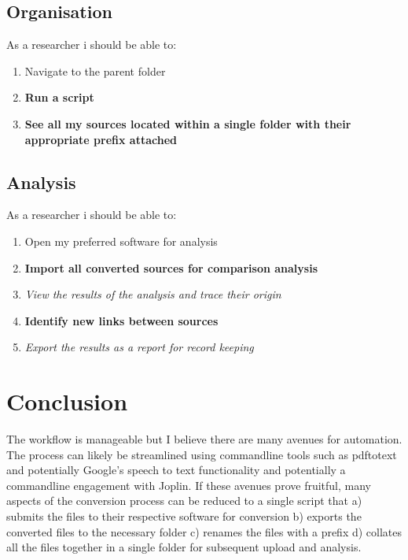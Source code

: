 \documentclass{article}
\begin{document}
\subsection{Organisation}
As a researcher i should be able to:
\begin{enumerate}
    \item Navigate to the parent folder
    \item\textbf{Run a script}
    \item\textbf{See all my sources located within a single folder with their appropriate prefix attached}
\end{enumerate}

\subsection{Analysis}
As a researcher i should be able to:
\begin{enumerate}
    \item Open my preferred software for analysis
    \item\textbf{Import all converted sources for comparison analysis}
    \item\textit{View the results of the analysis and trace their origin}
    \item\textbf{Identify new links between sources}
    \item\textit{Export the results as a report for record keeping}
\end{enumerate}

\section{Conclusion}
The workflow is manageable but I believe there are many avenues for automation. The process can likely be streamlined using commandline tools such as pdftotext and potentially Google's speech to text functionality and potentially a commandline engagement with Joplin. If these avenues prove fruitful, many aspects of the conversion process can be reduced to a single script that a) submits the files to their respective software for conversion b) exports the converted files to the necessary folder c) renames the files with a prefix d) collates all the files together in a single folder for subsequent upload and analysis.\par
\end{document}
